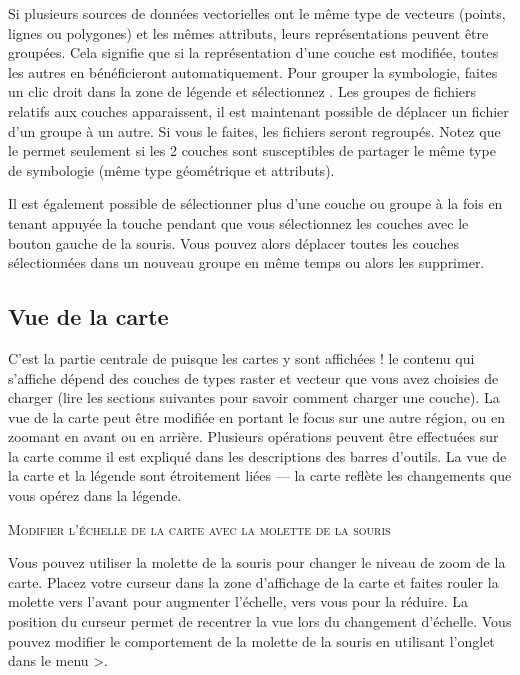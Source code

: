 Si plusieurs sources de données vectorielles ont le même type de vecteurs (points, lignes ou polygones) et les mêmes attributs, leurs représentations peuvent être groupées. Cela signifie que si la représentation d'une couche est modifiée, toutes les autres en bénéficieront automatiquement. Pour grouper la symbologie, faites un clic droit dans la zone de légende et sélectionnez . Les groupes de fichiers relatifs aux couches apparaissent, il est maintenant possible de déplacer un fichier d'un groupe à un autre. Si vous le faites, les fichiers seront regroupés. Notez que \qg le permet seulement si les 2 couches sont susceptibles de partager le même type de symbologie (même type géométrique et attributs).

Il est également possible de sélectionner plus d'une couche ou groupe à la fois en tenant appuyée la touche   pendant que vous sélectionnez les couches avec le bouton gauche de la souris. Vous pouvez alors déplacer toutes les couches sélectionnées dans un nouveau groupe en même temps ou alors les supprimer.

\subsection{Vue de la carte} \label{label_mapview}

C'est la partie centrale de \qg puisque les cartes y sont affichées ! le contenu qui s'affiche dépend des couches de types raster et vecteur que vous avez choisies de charger (lire les sections suivantes pour savoir comment charger une couche). La vue de la carte peut être modifiée en portant le focus sur une autre région, ou en zoomant en avant ou en arrière. Plusieurs opérations peuvent être effectuées sur la carte comme il est expliqué dans les descriptions des barres d'outils. La vue de la carte et la légende sont étroitement liées — la carte reflète les changements que vous opérez dans la légende.

\begin{Tip} \caption{\textsc{Modifier l'échelle de la carte avec la molette de la souris} }
Vous pouvez utiliser la molette de la souris pour changer le niveau de zoom de la carte. Placez votre curseur dans la zone d'affichage de la carte et faites rouler la molette vers l'avant pour augmenter l'échelle, vers vous pour la réduire. La position du curseur permet de recentrer la vue lors du changement d'échelle. Vous pouvez modifier le comportement de la molette de la souris en utilisant l'onglet  dans le menu  >.
\end{Tip}

